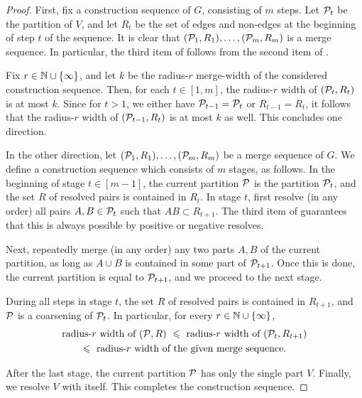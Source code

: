   \begin{proof}
  
  First, fix a construction sequence of $G$, consisting of $m$ steps. 
    Let $\cal P_t$ be the partition of $V$,
    and let $R_t$ be the set of edges and non-edges 
    at the beginning of step $t$ of the sequence.
    It is clear that 
    $(\cal P_1,R_1),\ldots,(\cal P_m,R_m)$ is a merge sequence. 
    In particular, the third item of  follows from the second item of .
    
    Fix $r\in\N\cup\set{\infty}$, and let $k$ 
    be the radius-$r$ merge-width of the considered construction sequence.
    Then, for each $t\in[1,m]$, 
    the radius-$r$ width of $(\cal P_t,R_t)$ is at most $k$.
    Since for $t>1$, we either have $\cal P_{t-1}=\cal P_t$ or $R_{t-1}=R_t$, it follows that 
    the radius-$r$ width of $(\cal P_{t-1},R_t)$ is at most $k$ as well.
    This concludes one direction.
  
  
  \medskip
  
  In the other direction,  
  let $(\cal P_1,R_1),\ldots,(\cal P_m,R_m)$ be a merge sequence of $G$.
  We define a construction sequence which consists of $m$ stages, as follows.
  In the beginning of stage $t\in[m-1]$,
  the current partition $\cal P$ is the partition $\cal P_t$, and the set $R$ of resolved pairs is contained in $R_t$.
  In stage $t$, first resolve (in any order) all pairs 
  $A,B\in\cal P_{t}$ such that $AB\subset R_{t+1}$.
  The third item of  guarantees that this is always possible by positive or negative resolves.

  Next, repeatedly merge (in any order) any two parts $A,B$ of the current partition, as long as $A\cup B$ is contained in some part of $\cal P_{t+1}$.
  Once this is done, the current partition is equal to $\cal P_{t+1}$, and we proceed to the next stage.
  
  During all steps in stage $t$, the set $R$ of resolved pairs is contained in $R_{t+1}$, and $\cal P$ is a coarsening of $\cal P_t$. In particular, for every $r\in\N\cup\set{\infty}$,
  \begin{multline*}
\text{radius-$r$ width of $(\cal P,R)$}\ \le \ 
\text{radius-$r$ width of $(\cal P_t,R_{t+1})$} \\
\le \ \text{radius-$r$ width of the given merge sequence}.
  \end{multline*}
 
  After the last stage, the current partition $\cal P$ has only the single part $V$. 
  Finally, we resolve $V$ with itself. This completes the  construction sequence.
  \end{proof}

